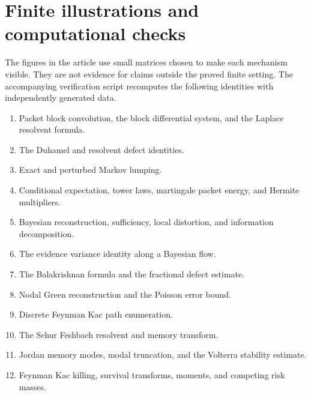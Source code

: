 \documentclass[11pt,a4paper]{article}
\theoremstyle{definition}
\theoremstyle{remark}
\begin{document}
\section{Finite illustrations and computational checks}\label{extended:section:17}\label{extended:sec:finite_checks}

The figures in the article use small matrices chosen to make each mechanism visible. They are not evidence for claims outside the proved finite setting. The accompanying verification script recomputes the following identities with independently generated data.

\begin{enumerate}
\item Packet block convolution, the block differential system, and the Laplace resolvent formula.
\item The Duhamel and resolvent defect identities.
\item Exact and perturbed Markov lumping.
\item Conditional expectation, tower laws, martingale packet energy, and Hermite multipliers.
\item Bayesian reconstruction, sufficiency, local distortion, and information decomposition.
\item The evidence variance identity along a Bayesian flow.
\item The Balakrishnan formula and the fractional defect estimate.
\item Nodal Green reconstruction and the Poisson error bound.
\item Discrete Feynman Kac path enumeration.
\item The Schur Feshbach resolvent and memory transform.
\item Jordan memory modes, modal truncation, and the Volterra stability estimate.
\item Feynman Kac killing, survival transforms, moments, and competing risk masses.
\end{enumerate}
\end{document}
